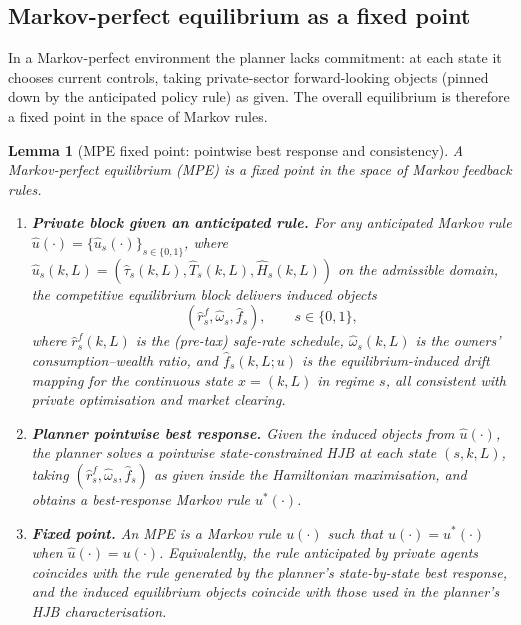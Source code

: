 \documentclass{article}
\newtheorem{lemma}{Lemma}
\begin{document}

\subsection{Markov-perfect equilibrium as a fixed point}\label{subsec:block3_mpe_fixed_point}

In a Markov-perfect environment the planner lacks commitment: at each state it chooses current
controls, taking private-sector forward-looking objects (pinned down by the anticipated policy rule)
as given. The overall equilibrium is therefore a fixed point in the space of Markov rules.

\begin{lemma}[MPE fixed point: pointwise best response and consistency]\label{lem:MPE_fixed_point}
A Markov-perfect equilibrium (MPE) is a fixed point in the space of Markov feedback rules.

\begin{enumerate}[leftmargin=2em,label=\arabic*.]
\item \textbf{Private block given an anticipated rule.}
For any anticipated Markov rule $\widehat u(\cdot)=\{\widehat u_s(\cdot)\}_{s\in\{0,1\}}$, where
$\widehat u_s(k,L)=(\widehat\tau_s(k,L),\widehat T_s(k,L),\widehat H_s(k,L))$ on the admissible domain,
the competitive equilibrium block delivers induced objects
\[
(\widehat r^f_s,\widehat\omega_s,\widehat f_s),
\qquad s\in\{0,1\},
\]
where $\widehat r^f_s(k,L)$ is the (pre-tax) safe-rate schedule, $\widehat\omega_s(k,L)$ is the owners'
consumption--wealth ratio, and $\widehat f_s(k,L;u)$ is the equilibrium-induced drift mapping
for the continuous state $x=(k,L)$ in regime $s$, all consistent with private optimisation and market clearing.

\item \textbf{Planner pointwise best response.}
Given the induced objects from $\widehat u(\cdot)$, the planner solves a pointwise state-constrained HJB
at each state $(s,k,L)$, taking $(\widehat r^f_s,\widehat\omega_s,\widehat f_s)$ as given inside the
Hamiltonian maximisation, and obtains a best-response Markov rule $u^*(\cdot)$.

\item \textbf{Fixed point.}
An MPE is a Markov rule $u(\cdot)$ such that $u(\cdot)=u^*(\cdot)$ when $\widehat u(\cdot)=u(\cdot)$.
Equivalently, the rule anticipated by private agents coincides with the rule generated by the planner's
state-by-state best response, and the induced equilibrium objects coincide with those used in the planner's
HJB characterisation.
\end{enumerate}
\end{lemma}
\end{document}
